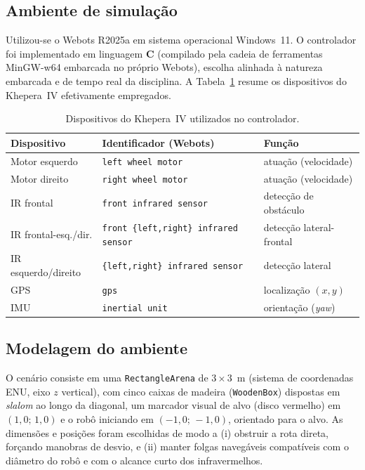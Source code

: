 \documentclass[11pt,a4paper]{article}
\begin{document}
\subsection{Ambiente de simulação}
Utilizou-se o Webots R2025a em sistema operacional Windows~11. O controlador foi implementado em linguagem \textbf{C} (compilado pela cadeia de ferramentas MinGW-w64 embarcada no próprio Webots), escolha alinhada à natureza embarcada e de tempo real da disciplina. A Tabela~\ref{tab:disp} resume os dispositivos do Khepera~IV efetivamente empregados.

\begin{table}[H]
\centering
\caption{Dispositivos do Khepera~IV utilizados no controlador.}
\label{tab:disp}
\begin{tabular}{@{}lll@{}}
\toprule
\textbf{Dispositivo} & \textbf{Identificador (Webots)} & \textbf{Função} \\
\midrule
Motor esquerdo & \texttt{left wheel motor} & atuação (velocidade) \\
Motor direito & \texttt{right wheel motor} & atuação (velocidade) \\
IR frontal & \texttt{front infrared sensor} & detecção de obstáculo \\
IR frontal-esq./dir. & \texttt{front \{left,right\} infrared sensor} & detecção lateral-frontal \\
IR esquerdo/direito & \texttt{\{left,right\} infrared sensor} & detecção lateral \\
GPS & \texttt{gps} & localização $(x,y)$ \\
IMU & \texttt{inertial unit} & orientação (\emph{yaw}) \\
\bottomrule
\end{tabular}
\end{table}

\subsection{Modelagem do ambiente}
O cenário consiste em uma \texttt{RectangleArena} de $3\times 3$~m (sistema de coordenadas ENU, eixo $z$ vertical), com cinco caixas de madeira (\texttt{WoodenBox}) dispostas em \emph{slalom} ao longo da diagonal, um marcador visual de alvo (disco vermelho) em $(1{,}0;\,1{,}0)$ e o robô iniciando em $(-1{,}0;\,-1{,}0)$, orientado para o alvo. As dimensões e posições foram escolhidas de modo a (i) obstruir a rota direta, forçando manobras de desvio, e (ii) manter folgas navegáveis compatíveis com o diâmetro do robô e com o alcance curto dos infravermelhos.
\end{document}
